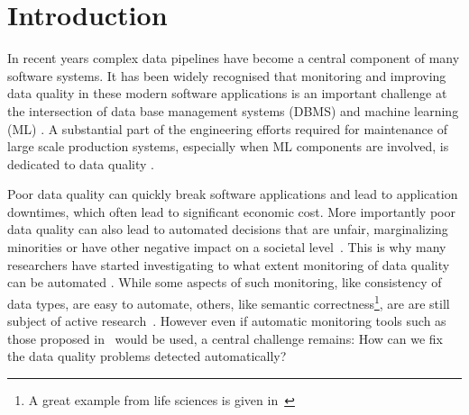 \section{Introduction}
\label{sec:introduction}

In recent years complex data pipelines have become a central component of many software systems. It has been widely recognised that monitoring and improving data quality in these modern software applications is an important challenge at the intersection of data base management systems (DBMS) and machine learning (ML) \citep{Schelter2015,Abedjan2018}. A substantial part of the engineering efforts required for maintenance of large scale production systems, especially when ML components are involved, is dedicated to data quality \citep{Sculley2015,Bose2017b}. 

Poor data quality can quickly break software applications and lead to application downtimes, which often lead to significant economic cost. More importantly poor data quality can also lead to automated decisions that are unfair, marginalizing minorities or have other negative impact on a societal level~\citep{Stoyanovich2020,Yang2020,Bender2021}. This is why many researchers have started investigating to what extent monitoring of data quality can be automated \citep{Abedjan2016,Baylor2017,Schelter2018,rukat2020towards}. While some aspects of such monitoring, like consistency of data types, are easy to automate, others, like semantic correctness\footnote{A great example from life sciences is given in~\citep{Ziemann2016}}, are are still subject of active research~\citep{biessmann2021automated}. However even if automatic monitoring tools such as those proposed in~\citep{Schelter2017} would be used, a central challenge remains: How can we fix the data quality problems detected automatically?

